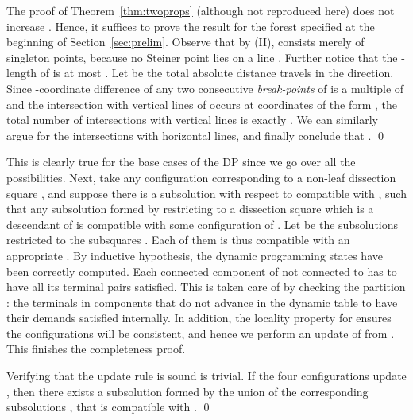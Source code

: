 \documentclass[extras,11pt]{article} \usepackage{fullpage}
\theoremstyle{mytheorem}
\newenvironment{proofof}[1]{\par\noindent{\bf #1.}\hspace{0.5em}}
    {\hfill\qed\vspace{1ex}}
\begin{document}
\begin{proofof}{\proofname\ of Lemma~\ref{lem:tot-int}}
 The proof of Theorem~\ref{thm:twoprops} (although not reproduced here) does not increase .
 Hence, it suffices to prove the result for the forest  specified at the beginning of Section~\ref{sec:prelim}.
 Observe that by (II),   consists merely of singleton points,
 because no Steiner point lies on a line .
 Further notice that the -length of  is at most .
 Let  be the total absolute distance  travels in the  direction. Since -coordinate difference of any two consecutive \emph{break-points} of  is a multiple of  and the intersection with vertical lines of  occurs at coordinates of the form , the total number of intersections with vertical lines is exactly .
 We can similarly argue for the intersections with horizontal lines, and finally conclude that  .
\end{proofof}


\begin{proofof}{\proofname\ of Lemma~\ref{lem:dp-sf}}
This is clearly true for the base cases of the DP since we go over all the possibilities.
Next, take any configuration  corresponding to a non-leaf dissection square ,
and suppose there is a subsolution  with respect to  compatible with ,
 such that any subsolution  formed by restricting  to a dissection square  which is a descendant of  is compatible with some configuration  of .
Let  be the subsolutions restricted to the subsquares .
Each of them is thus compatible with an appropriate .
By inductive hypothesis, the dynamic programming states  have been correctly computed.
Each connected component of  not connected to  has to have all its terminal pairs satisfied.
This is taken care of by checking the partition :
the terminals in components that do not advance in the dynamic table to  have their demands satisfied internally.
In addition, the locality property for  ensures the configurations will be consistent,
and hence we perform an update of  from .
This finishes the completeness proof.

Verifying that the update rule is sound is trivial.
If the four configurations  update ,
then there exists a subsolution  formed by the union of the corresponding subsolutions , that is compatible with .
\end{proofof}


\iffalse
\begin{proofof}{\proofname\ of Claim~\ref{clm:mpcsf:eps}}
The total cost of this solution is

where \eqref{eqn:14} follows from ,
and \eqref{eqn:15} uses the definition of .
\end{proofof}
\fi
\end{document}

